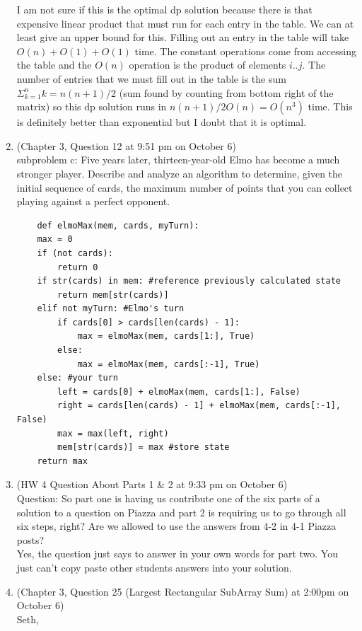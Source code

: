 \documentclass{article}
\begin{document}
\begin{enumerate}
        I am not sure if this is the optimal dp solution because there is that expensive linear product that must run for each entry in the table. We can at least give an upper bound for this. Filling out an entry in the table will take $O (n) + O(1) + O(1)$ time. The constant operations come from accessing the table and the $O(n)$ operation is the product of elements $i..j$. The number of entries that we must fill out in the table is the sum $\Sigma _{k=1}^n k = n(n+1)/2$ (sum found by counting from bottom right of the matrix) so this dp solution runs in $n(n+1)/2 O (n) = O(n^3)$ time. This is definitely better than exponential but I doubt that it is optimal.
   	\item (Chapter 3, Question 12 at 9:51 pm on October 6)\\
        	subproblem c: Five years later, thirteen-year-old Elmo has become a much stronger player. Describe and analyze an algorithm to determine, given the initial sequence of cards, the maximum number of points that you can collect playing against a perfect opponent.
    \begin{Verbatim}
    def elmoMax(mem, cards, myTurn):
    max = 0
    if (not cards):
        return 0
    if str(cards) in mem: #reference previously calculated state
        return mem[str(cards)]
    elif not myTurn: #Elmo's turn
        if cards[0] > cards[len(cards) - 1]:
            max = elmoMax(mem, cards[1:], True)
        else:
            max = elmoMax(mem, cards[:-1], True)
    else: #your turn
        left = cards[0] + elmoMax(mem, cards[1:], False)
        right = cards[len(cards) - 1] + elmoMax(mem, cards[:-1], False)
        max = max(left, right)
        mem[str(cards)] = max #store state
    return max
    \end{Verbatim}
    \item (HW 4 Question About Parts 1 & 2 at 9:33 pm on October 6) \\
        Question: So part one is having us 	contribute one of the six parts of a solution to a question on Piazza and part 2 is requiring us to go through all six steps, right? Are we allowed to use the answers from 4-2 in 4-1 Piazza posts? \\
        Yes, the question just says to answer in your own words for part two. You just can't copy paste other students answers into your solution.
  	\item (Chapter 3, Question 25 (Largest Rectangular SubArray Sum) at 2:00pm on October 6) \\
        Seth,


\end{enumerate}
\end{document}
